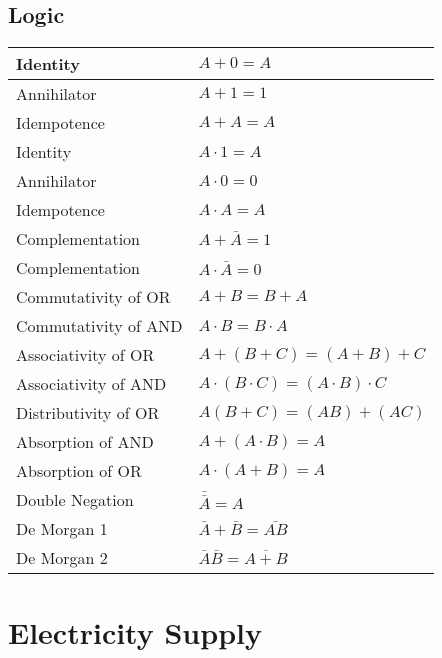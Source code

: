 \documentclass[12pt]{article}
\begin{document}
\subsection{Logic}
\begin{table}[ht]
  \begin{tabular}{|m{4cm}|m{9cm}|}
    \hline
    Identity & $A + 0 = A$ \\
    \hline
    Annihilator &  $A + 1 = 1$ \\
    \hline
    Idempotence & $A+A=A$ \\
    \hline 
    Identity &  $A \cdot 1 = A$ \\
    \hline 
    Annihilator & $A \cdot 0 = 0$ \\
    \hline 
    Idempotence & $A \cdot A = A$ \\ 
    \hline 
    Complementation & $A + \bar{A} = 1$ \\
    \hline 
    Complementation & $A \cdot \bar{A} = 0$ \\
    \hline 
    Commutativity of OR & $A + B = B + A$ \\
    \hline
    Commutativity of AND & $A \cdot B = B \cdot A$ \\
    \hline 
    Associativity of OR & $A + (B + C) = (A + B) + C$ \\
    \hline
    Associativity of AND & $A \cdot (B \cdot C) = (A \cdot B) \cdot C$ \\
    \hline
    Distributivity of OR & $A(B+C) = (AB) + (AC)$ \\
    \hline 
    Absorption of AND & $A + (A \cdot B) = A$ \\
    \hline 
    Absorption of OR & $A \cdot (A + B) = A$ \\
    \hline 
    Double Negation &  $\bar{\bar{A}} = A$ \\
    \hline 
    De Morgan 1 & $\bar{A} + \bar{B} = \bar{AB}$ \\
    \hline
    De Morgan 2 & $\bar{A}\bar{B} = \overline{A+B}$ \\
    \hline
  \end{tabular}
\end{table}

\section{Electricity Supply}
\end{document}
